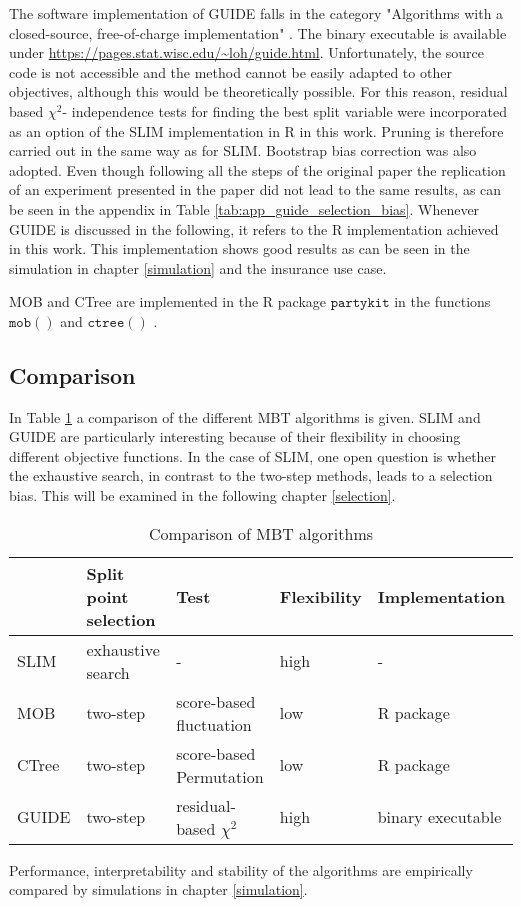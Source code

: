 The software implementation of GUIDE falls in the category "Algorithms with a closed-source, free-of-charge implementation" \citep{Loh.2014}. The binary executable is available under \url{https://pages.stat.wisc.edu/~loh/guide.html}.  Unfortunately, the source code is not accessible and the method cannot be easily adapted to other objectives, although this would be theoretically possible. For this reason, residual based $\chi^2$- independence tests for finding the best split variable were incorporated as an option of the SLIM implementation in R in this work. Pruning is therefore carried out in the same way as for SLIM. Bootstrap bias correction was also adopted. Even though following all the steps of the original paper \citep{Loh.2002} the replication of an experiment presented in the paper did not lead to the same results, as can be seen in the appendix in Table \ref{tab:app_guide_selection_bias}. 
Whenever GUIDE is discussed in the following, it refers to the R implementation achieved in this work. This implementation shows good results as can be seen in the simulation in chapter \ref{simulation} and the insurance use case.

MOB and CTree are implemented in the R package $\mathtt{partykit}$ \citep{Hothorn.2015} in the functions $\mathtt{mob()}$ \citep{Zeileis.2008} and $\mathtt{ctree()}$ \citep{Hothorn.2006}.




\subsection{Comparison}

In Table \ref{tab:mbt_comparison} a comparison of the different MBT algorithms is given. SLIM and GUIDE are particularly interesting because of their flexibility in choosing different objective functions. In the case of SLIM, one open question is whether the exhaustive search, in contrast to the two-step methods, leads to a selection bias. This will be examined in the following chapter \ref{selection}.
\begin{table}[ht]
\centering
\begin{tabular}{lllll}
  \hline
 & Split point selection & Test & Flexibility & Implementation  \\ 
  \hline
    SLIM & exhaustive search & - & high & - \\ 
    MOB & two-step & score-based fluctuation & low & R package \\ 
    CTree & two-step & score-based Permutation & low & R package\\ 
    GUIDE & two-step & residual-based $\chi^2$  & high & binary executable\\ 
   \hline
\end{tabular}
\caption{Comparison of MBT algorithms}
\label{tab:mbt_comparison}
\end{table}

Performance, interpretability and stability of the algorithms are empirically compared by simulations in chapter \ref{simulation}.


